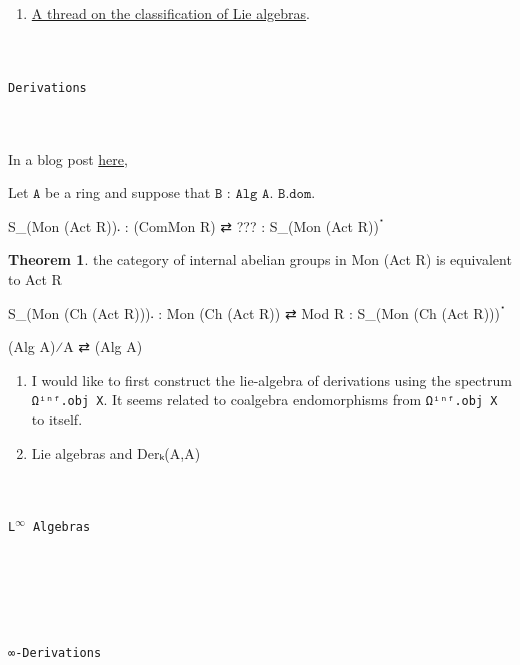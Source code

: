 \documentclass{book}
\theoremstyle{definition}
\newtheorem{theorem}{Theorem}
\renewcommand{\chapter}[1]{
\newpage
{
\Huge 
\begin{center}
\ \\
\ \\
\thispagestyle{empty}
\texttt{#1}
\end{center}}
\ \\
\ \\
}
\begin{document}
\begin{enumerate}
\item \href{https://leanprover.zulipchat.com/#narrow/stream/287929-mathlib4/topic/The.20classification.20of.20Lie.20algebras}{A thread on the classification of Lie algebras}.
\end{enumerate}


\newpage
\chapter{Derivations}

In a blog post \href{https://amathew.wordpress.com/2011/05/14/the-cotangent-complex-i-group-objects-in-categories-of-algebras/}{here},



Let $\texttt{A}$ be a ring and suppose that $\texttt{B : Alg A}$. $\texttt{B.dom}$.\\

\begin{center}
S\_(Mon (Act R))𛲔 : (ComMon R) ⇄ ??? : S\_(Mon (Act R))ॱ
\end{center}

\begin{theorem}the category of internal abelian groups in Mon (Act R) is equivalent to Act R
\end{theorem}

\begin{center}
S\_(Mon (Ch (Act R)))𛲔 : Mon (Ch (Act R)) ⇄ Mod R : S\_(Mon (Ch (Act R)))ॱ
\end{center}


\begin{center}
(Alg A)⁄A ⇄ (Alg A)
\end{center}


\begin{enumerate}
\item I would like to first construct the lie-algebra of derivations using the spectrum \texttt{Ωⁱⁿᶠ.obj X}. It seems related to coalgebra endomorphisms from \texttt{Ωⁱⁿᶠ.obj X} to itself.
\item Lie algebras and Derₖ(A,A)
\end{enumerate}


\newpage
\chapter{L${}^{\infty}$ Algebras}




\newpage
\chapter{∞-Derivations}
\end{document}
